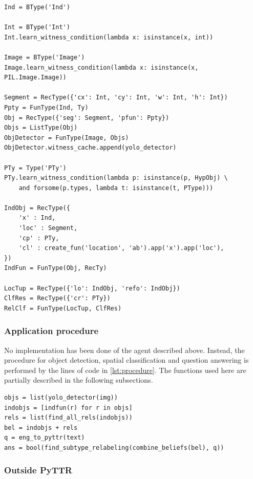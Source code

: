 \begin{lstlisting}[label={lst:pyttrbasic}, caption=TTR type definitions]
Ind = BType('Ind')

Int = BType('Int')
Int.learn_witness_condition(lambda x: isinstance(x, int))

Image = BType('Image')
Image.learn_witness_condition(lambda x: isinstance(x, PIL.Image.Image))

Segment = RecType({'cx': Int, 'cy': Int, 'w': Int, 'h': Int})
Ppty = FunType(Ind, Ty)
Obj = RecType({'seg': Segment, 'pfun': Ppty})
Objs = ListType(Obj)
ObjDetector = FunType(Image, Objs)
ObjDetector.witness_cache.append(yolo_detector)

PTy = Type('PTy')
PTy.learn_witness_condition(lambda p: isinstance(p, HypObj) \
    and forsome(p.types, lambda t: isinstance(t, PType)))

IndObj = RecType({
    'x' : Ind,
    'loc' : Segment,
    'cp' : PTy,
    'cl' : create_fun('location', 'ab').app('x').app('loc'),
})
IndFun = FunType(Obj, RecTy)

LocTup = RecType({'lo': IndObj, 'refo': IndObj})
ClfRes = RecType({'cr': PTy})
RelClf = FunType(LocTup, ClfRes)
\end{lstlisting}



\subsubsection{Application procedure}

No implementation has been done of the agent described above.
Instead, the procedure for object detection, spatial classification and question answering is performed by the lines of code in \autoref{lst:procedure}.
The functions used here are partially described in the following subsections.

\begin{lstlisting}[label=lst:procedure, caption=Application procedure]
objs = list(yolo_detector(img))
indobjs = [indfun(r) for r in objs]
rels = list(find_all_rels(indobjs))
bel = indobjs + rels
q = eng_to_pyttr(text)
ans = bool(find_subtype_relabeling(combine_beliefs(bel), q))
\end{lstlisting}



\subsubsection{Outside PyTTR}

